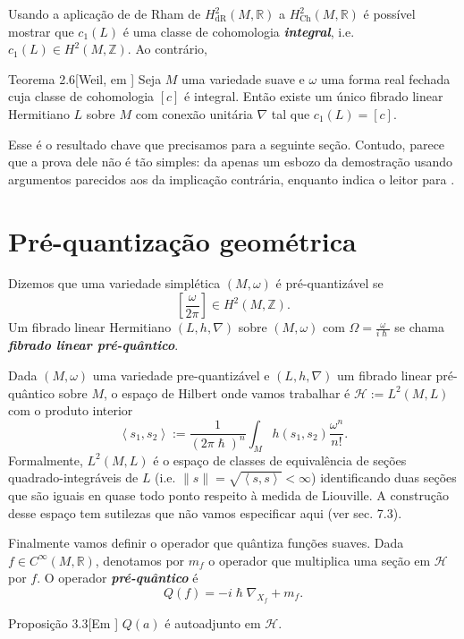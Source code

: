Usando a aplicação de de Rham de $H_{\operatorname{dR}}^2(M,\mathbb{R})$ a $H^{2}_{\operatorname{Ch}}(M,\mathbb{R})$ é possível mostrar que $c_1(L)$ é uma classe de cohomologia \textit{\textbf{integral}}, i.e. $c_1(L)\in H^{2}(M,\mathbb{Z})$. Ao contrário,
\begin{thing4}{Teorema 2.6}[Weil, em \cite{wang}]\leavevmode
	Seja $M$ uma variedade suave e $\omega$ uma forma real fechada cuja classe de cohomologia $[c]$  é integral. Então existe um único fibrado linear Hermitiano $L$ sobre $M$ com conexão unitária $\nabla$ tal que $c_1(L)=[c]$.
\end{thing4}
Esse é o resultado chave que precisamos para a seguinte seção. Contudo, parece que a prova dele não é tão simples: \cite{wang} da apenas um esbozo da demostração usando argumentos parecidos aos da implicação contrária, enquanto \cite{hallq} indica o leitor para \cite{wood}.

\section{Pré-quantização geométrica}

Dizemos que uma variedade simplética $(M,\omega)$ é pré-quantizável se
\[\left[ \frac{\omega}{2\pi} \right] \in H^{2}(M,\mathbb{Z}).\]
Um fibrado linear Hermitiano $(L,h,\nabla)$ sobre $(M,\omega)$ com $\Omega=\frac{\omega}{i\hslash}$ se chama \textit{\textbf{fibrado linear pré-quântico}}.

Dada $(M,\omega)$ uma variedade pre-quantizável e $(L,h,\nabla)$ um fibrado linear pré-quântico sobre $M$, o espaço de Hilbert onde vamos trabalhar é $\mathcal{H}:=L^2(M,L)$ com o produto interior
\[\left<s_1,s_2\right>:=\frac{1}{(2\pi \hslash)^n}\int_{M}h(s_1,s_2)\frac{\omega^n}{n!}.\]
Formalmente, $L^2(M,L)$ é o espaço de classes de equivalência de seções quadrado-integráveis de $L$ (i.e. $\|s\|=\sqrt{\left<s,s\right>}<\infty$) identificando duas seções que são iguais en quase todo ponto respeito à medida de Liouville. A construção desse espaço tem sutilezas que não vamos especificar aqui (ver \cite{hallq} sec. 7.3).

Finalmente vamos definir o operador que quântiza funções suaves. Dada $f \in C^\infty(M,\mathbb{R})$, denotamos por $m_f$ o operador que multiplica uma seção em $\mathcal{H}$ por $f$. O operador \textit{\textbf{pré-quântico}}  é
\[Q(f)=-i\hslash \nabla_{X_f}+m_f.\]

\begin{thing4}{Proposição 3.3}[Em \cite{wang}]\leavevmode
$Q(a)$ é autoadjunto em $\mathcal{H}$.	
\end{thing4}

